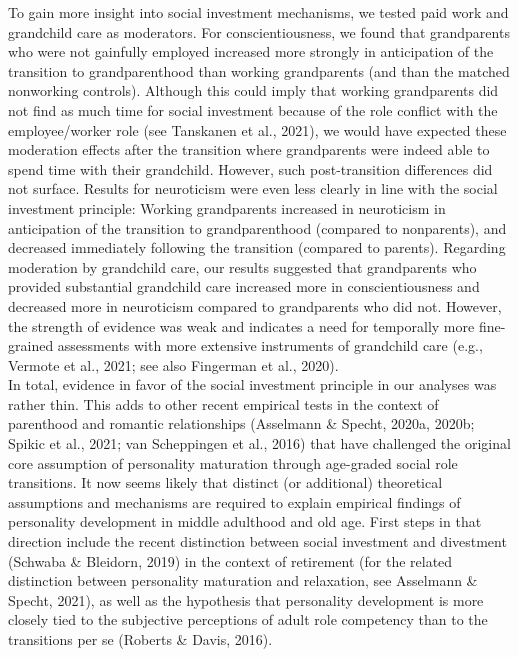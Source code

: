 \documentclass[
  english,
  man, noextraspace]{apa7}
\begin{document}
To gain more insight into social investment mechanisms, we tested paid work and grandchild care as moderators. For conscientiousness, we found that grandparents who were not gainfully employed increased more strongly in anticipation of the transition to grandparenthood than working grandparents (and than the matched nonworking controls). Although this could imply that working grandparents did not find as much time for social investment because of the role conflict with the employee/worker role (see Tanskanen et al., 2021), we would have expected these moderation effects after the transition where grandparents were indeed able to spend time with their grandchild. However, such post-transition differences did not surface. Results for neuroticism were even less clearly in line with the social investment principle: Working grandparents increased in neuroticism in anticipation of the transition to grandparenthood (compared to nonparents), and decreased immediately following the transition (compared to parents). Regarding moderation by grandchild care, our results suggested that grandparents who provided substantial grandchild care increased more in conscientiousness and decreased more in neuroticism compared to grandparents who did not. However, the strength of evidence was weak and indicates a need for temporally more fine-grained assessments with more extensive instruments of grandchild care (e.g., Vermote et al., 2021; see also Fingerman et al., 2020).\\
In total, evidence in favor of the social investment principle in our analyses was rather thin. This adds to other recent empirical tests in the context of parenthood and romantic relationships (Asselmann \& Specht, 2020a, 2020b; Spikic et al., 2021; van Scheppingen et al., 2016) that have challenged the original core assumption of personality maturation through age-graded social role transitions. It now seems likely that distinct (or additional) theoretical assumptions and mechanisms are required to explain empirical findings of personality development in middle adulthood and old age. First steps in that direction include the recent distinction between social investment and divestment (Schwaba \& Bleidorn, 2019) in the context of retirement (for the related distinction between personality maturation and relaxation, see Asselmann \& Specht, 2021), as well as the hypothesis that personality development is more closely tied to the subjective perceptions of adult role competency than to the transitions per se (Roberts \& Davis, 2016).\\
\end{document}
